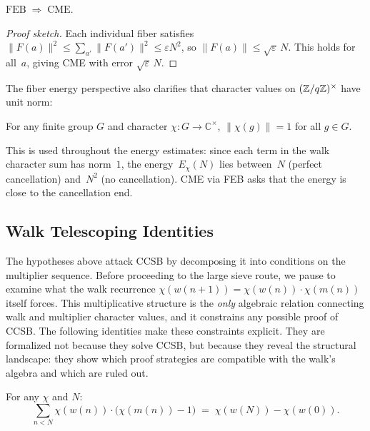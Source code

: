 \begin{theorem}
$\mathrm{FEB} \;\Longrightarrow\; \mathrm{CME}$.
\end{theorem}

\begin{proof}[Proof sketch]
Each individual fiber satisfies $\|F(a)\|^2 \leq \sum_{a'} \|F(a')\|^2
\leq \varepsilon N^2$, so $\|F(a)\| \leq \sqrt{\varepsilon}\, N$.
This holds for all~$a$, giving CME with error $\sqrt{\varepsilon}\, N$.
\end{proof}

The fiber energy perspective also clarifies that character values on
$(\mathbb{Z}/q\mathbb{Z})^\times$ have unit norm:

\begin{theorem}
For any finite group $G$ and character $\chi : G \to \mathbb{C}^\times$,
$\|\chi(g)\| = 1$ for all $g \in G$.
\end{theorem}

\noindent This is used throughout the energy estimates: since each term
in the walk character sum has norm~$1$, the energy~$E_\chi(N)$ lies
between~$N$ (perfect cancellation) and~$N^2$ (no cancellation).
CME via FEB asks that the energy is close to the cancellation end.

\subsection{Walk Telescoping Identities}
\label{sec:telescope}

The hypotheses above attack CCSB by decomposing it into conditions on
the multiplier sequence.  Before proceeding to the large sieve route,
we pause to examine what the walk recurrence
$\chi(w(n{+}1)) = \chi(w(n)) \cdot \chi(m(n))$ itself forces.  This
multiplicative structure is the \emph{only} algebraic relation
connecting walk and multiplier character values, and it constrains
any possible proof of CCSB\@.  The following identities make these
constraints explicit.  They are formalized not because they solve
CCSB, but because they reveal the structural landscape: they show
which proof strategies are compatible with the walk's algebra and
which are ruled out.

\begin{theorem}
\label{thm:telescope}
For any $\chi$ and $N$:
\[
  \sum_{n < N} \chi(w(n))\cdot\bigl(\chi(m(n)) - 1\bigr)
  \;=\; \chi(w(N)) - \chi(w(0)).
\]
\end{theorem}

